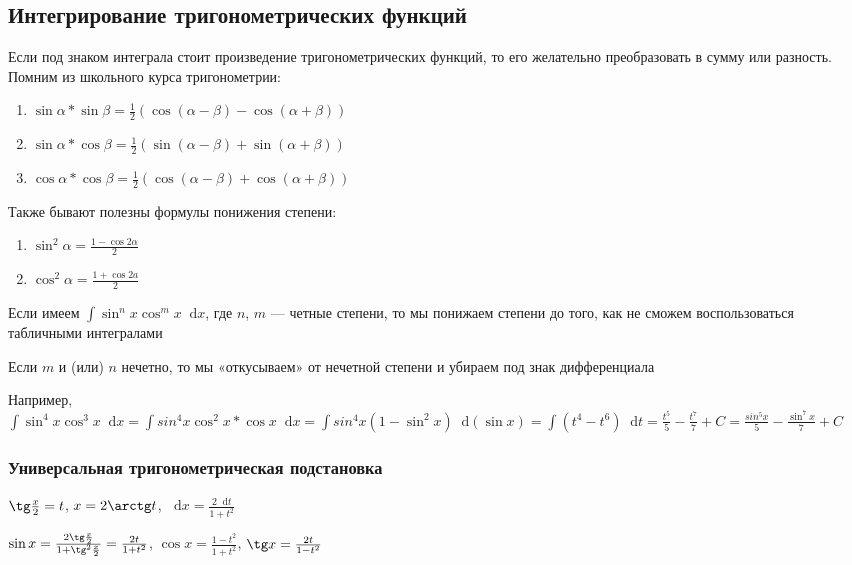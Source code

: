 \documentclass{article}
\newcommand*\diff{\mathop{}\!\mathrm{d}}
\begin{document}
\subsection{Интегрирование тригонометрических функций}

Если под знаком интеграла стоит произведение тригонометрических функций, то его желательно преобразовать в сумму или разность. Помним из школьного курса тригонометрии:

\begin{enumerate}
    \item $\sin \alpha * \sin \beta = \frac{1}{2} (\cos (\alpha - \beta) - \cos (\alpha + \beta))$
    \item $\sin \alpha * \cos \beta = \frac{1}{2} (\sin (\alpha - \beta) + \sin (\alpha + \beta))$
    \item $\cos \alpha * \cos \beta = \frac{1}{2} (\cos (\alpha - \beta) + \cos (\alpha + \beta))$
\end{enumerate}

Также бывают полезны формулы понижения степени:

\begin{enumerate}
    \item $\sin^2 \alpha = \frac{1 - \cos 2 \alpha}{2}$
    \item $\cos^2 \alpha = \frac{1 + \cos 2 a}{2}$
\end{enumerate}

Если имеем $\int \sin^{n} x \cos^{m} x \diff x$, где $n$, $m$ — четные степени, то мы понижаем степени до того, как не сможем воспользоваться табличными интегралами

\hfill

Если $m$ и (или) $n$ нечетно, то мы «откусываем» от нечетной степени и убираем под знак дифференциала

Например, $\int \sin^4 x \cos^3 x \diff x = \int sin^4 x \cos^2 x * \cos x \diff x = \int sin^4 x (1 - \sin^2 x) \diff (\sin x) = \int (t^4 - t^6) \diff t = \frac{t^5}{5} - \frac{t^7}{7} + C = \frac{sin^5 x}{5} - \frac{\sin^7 x}{7} + C$

\subsubsection{Универсальная тригонометрическая подстановка}

$\tg \frac{x}{2} = t$, $x = 2 \arctg t$, $\diff x = \frac{2 \diff t}{1 + t^2}$

$\sin x = \frac{2 \tg \frac{x}{2}}{1 + \tg^2 \frac{x}{2}} = \frac{2 t}{1 + t^2}$, $\cos x = \frac{1 - t^2}{1 + t^2}$, $\tg x = \frac{2 t}{1 - t^2}$
\end{document}
